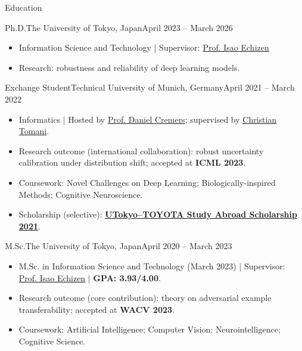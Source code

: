 \documentclass[]{mcdowellcv}
\begin{document}
\begin{cvsection}{Education}
  \begin{cvsubsection}{Ph.D.}{The University of Tokyo, Japan}{April 2023 -- March 2026}
    \begin{itemize}
      \item Information Science and Technology | Supervisor: \href{https://scholar.google.co.jp/citations?user=RduUnVIAAAAJ&hl=en}{Prof. Isao Echizen}
      \item Research: robustness and reliability of deep learning models.
    \end{itemize}
  \end{cvsubsection}

  \begin{cvsubsection}{Exchange Student}{Technical University of Munich, Germany}{April 2021 -- March 2022}
    \begin{itemize}
      \item Informatics | Hosted by \href{https://scholar.google.co.jp/citations?hl=en&user=cXQciMEAAAAJ}{Prof. Daniel Cremers}; supervised by \href{https://scholar.google.co.jp/citations?user=gfRxpTUAAAAJ&hl=ja&oi=ao}{Christian Tomani}.
      \item Research outcome (international collaboration): robust uncertainty calibration under distribution shift; accepted at \textbf{ICML 2023}.
      \item Coursework: Novel Challenges on Deep Learning; Biologically-inspired Methods; Cognitive Neuroscience.
      \item Scholarship (selective): \href{https://www.u-tokyo.ac.jp/adm/go-global/ja/scholarship-list-toyota.html}{\textbf{UTokyo--TOYOTA Study Abroad Scholarship 2021}}.
    \end{itemize}
  \end{cvsubsection}

  \begin{cvsubsection}{M.Sc.}{The University of Tokyo, Japan}{April 2020 -- March 2023}
    \begin{itemize}
      \item M.Sc. in Information Science and Technology (March 2023) | Supervisor: \href{https://scholar.google.co.jp/citations?user=RduUnVIAAAAJ&hl=en}{Prof. Isao Echizen} | \textbf{GPA: 3.93/4.00}.
      \item Research outcome (core contribution): theory on adversarial example transferability; accepted at \textbf{WACV 2023}.
      \item Coursework: Artificial Intelligence; Computer Vision; Neurointelligence; Cognitive Science.
    \end{itemize}
  \end{cvsubsection}


\end{cvsection}
\end{document}
